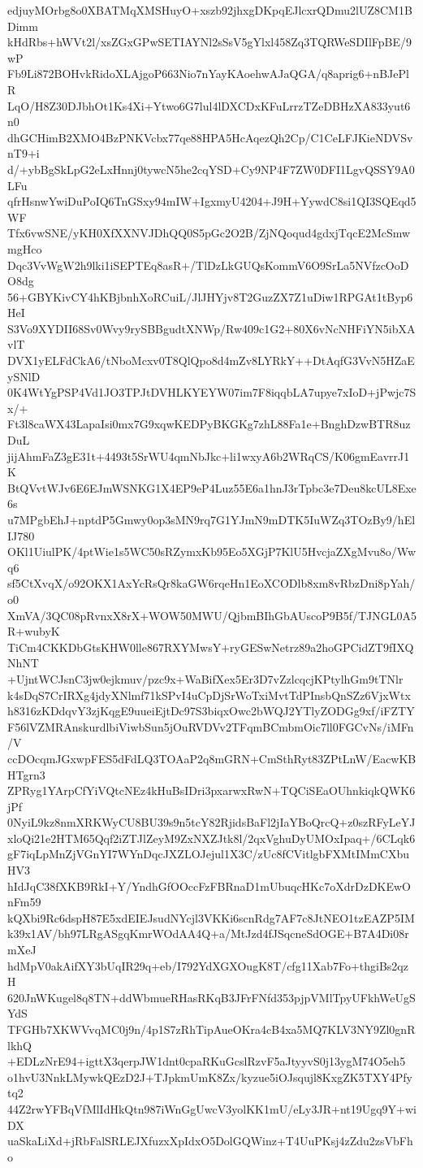 edjuyMOrbg8o0XBATMqXMSHuyO+xszb92jhxgDKpqEJlcxrQDmu2lUZ8CM1BDimm
kHdRbs+hWVt2l/xsZGxGPwSETIAYNl2sSsV5gYlxl458Zq3TQRWeSDIlFpBE/9wP
Fb9Li872BOHvkRidoXLAjgoP663Nio7nYayKAoehwAJaQGA/q8aprig6+nBJePlR
LqO/H8Z30DJbhOt1Ks4Xi+Ytwo6G7lul4lDXCDxKFuLrrzTZeDBHzXA833yut6n0
dhGCHimB2XMO4BzPNKVcbx77qe88HPA5HcAqezQh2Cp/C1CeLFJKieNDVSvnT9+i
d/+ybBgSkLpG2eLxHnnj0tywcN5he2cqYSD+Cy9NP4F7ZW0DFI1LgvQSSY9A0LFu
qfrHsnwYwiDuPoIQ6TnGSxy94mIW+IgxmyU4204+J9H+YywdC8si1QI3SQEqd5WF
Tfx6vwSNE/yKH0XfXXNVJDhQQ0S5pGc2O2B/ZjNQoqud4gdxjTqcE2McSmwmgHco
Dqc3VvWgW2h9lki1iSEPTEq8asR+/TlDzLkGUQsKommV6O9SrLa5NVfzcOoDO8dg
56+GBYKivCY4hKBjbnhXoRCuiL/JlJHYjv8T2GuzZX7Z1uDiw1RPGAt1tByp6HeI
S3Vo9XYDII68Sv0Wvy9rySBBgudtXNWp/Rw409c1G2+80X6vNcNHFiYN5ibXAvlT
DVX1yELFdCkA6/tNboMcxv0T8QlQpo8d4mZv8LYRkY++DtAqfG3VvN5HZaEySNlD
0K4WtYgPSP4Vd1JO3TPJtDVHLKYEYW07im7F8iqqbLA7upye7xIoD+jPwjc7Sx/+
Ft3l8caWX43LapaIsi0mx7G9xqwKEDPyBKGKg7zhL88Fa1e+BnghDzwBTR8uzDuL
jijAhmFaZ3gE31t+4493t5SrWU4qmNbJkc+li1wxyA6b2WRqCS/K06gmEavrrJ1K
BtQVvtWJv6E6EJmWSNKG1X4EP9eP4Luz55E6a1hnJ3rTpbc3e7Deu8kcUL8Exe6s
u7MPgbEhJ+nptdP5Gmwy0op3sMN9rq7G1YJmN9mDTK5IuWZq3TOzBy9/hElIJ780
OKl1UiulPK/4ptWie1s5WC50sRZymxKb95Eo5XGjP7KlU5HvcjaZXgMvu8o/Wwq6
sf5CtXvqX/o92OKX1AxYcRsQr8kaGW6rqeHn1EoXCODlb8xm8vRbzDni8pYah/o0
XmVA/3QC08pRvnxX8rX+WOW50MWU/QjbmBIhGbAUscoP9B5f/TJNGL0A5R+wubyK
TiCm4CKKDbGtsKHW0lle867RXYMwsY+ryGESwNetrz89a2hoGPCidZT9fIXQNhNT
+UjntWCJsnC3jw0ejkmuv/pzc9x+WaBifXex5Er3D7vZzlcqcjKPtylhGm9tTNlr
k4sDqS7CrIRXg4jdyXNlmf71kSPvI4uCpDjSrWoTxiMvtTdPInsbQnSZz6VjxWtx
h8316zKDdqvY3zjKqgE9uueiEjtDc97S3biqxOwc2bWQJ2YTlyZODGg9xf/iFZTY
F56lVZMRAnskurdlbiViwbSun5jOuRVDVv2TFqmBCmbmOic7ll0FGCvNs/iMFn/V
ccDOcqmJGxwpFES5dFdLQ3TOAaP2q8mGRN+CmSthRyt83ZPtLnW/EacwKBHTgrn3
ZPRyg1YArpCfYiVQtcNEz4kHuBsIDri3pxarwxRwN+TQCiSEaOUhnkiqkQWK6jPf
0NyiL9kz8nmXRKWyCU8BU39s9n5tcY82RjidsBaFl2jIaYBoQrcQ+z0szRFyLeYJ
xloQi21e2HTM65Qqf2iZTJlZeyM9ZxNXZJtk8l/2qxVghuDyUMOxIpaq+/6CLqk6
gF7iqLpMnZjVGnYI7WYnDqcJXZLOJejul1X3C/zUc8fCVitlgbFXMtIMmCXbuHV3
hIdJqC38fXKB9RkI+Y/YndhGfOOccFzFBRnaD1mUbuqcHKc7oXdrDzDKEwOnFm59
kQXbi9Rc6dspH87E5xdEIEJsudNYcjl3VKKi6scnRdg7AF7c8JtNEO1tzEAZP5IM
k39x1AV/bh97LRgASgqKmrWOdAA4Q+a/MtJzd4fJSqcneSdOGE+B7A4Di08rmXeJ
hdMpV0akAifXY3bUqIR29q+eb/I792YdXGXOugK8T/cfg11Xab7Fo+thgiBs2qzH
620JnWKugel8q8TN+ddWbmueRHasRKqB3JFrFNfd353pjpVMlTpyUFkhWeUgSYdS
TFGHb7XKWVvqMC0j9n/4p1S7zRhTipAueOKra4cB4xa5MQ7KLV3NY9Zl0gnRlkhQ
+EDLzNrE94+igttX3qerpJW1dnt0cpaRKuGcslRzvF5aJtyyvS0j13ygM74O5eh5
o1hvU3NnkLMywkQEzD2J+TJpkmUmK8Zx/kyzue5iOJsqujl8KxgZK5TXY4Pfytq2
44Z2rwYFBqVfMlIdHkQtn987iWnGgUwcV3yolKK1mU/eLy3JR+nt19Ugq9Y+wiDX
uaSkaLiXd+jRbFalSRLEJXfuzxXpIdxO5DolGQWinz+T4UuPKsj4zZdu2zsVbFho
